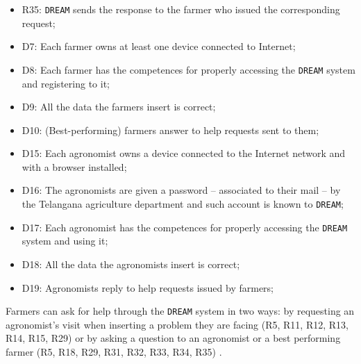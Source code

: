 \documentclass{article}
\begin{document}
\begin{itemize}
    \item R35: \verb|DREAM| sends the response to the farmer who issued the corresponding request;
    
    \item D7: Each farmer owns at least one device connected to Internet;
    
    \item D8: Each farmer has the competences for properly accessing the \verb|DREAM| system and registering to it;
    
    \item D9: All the data the farmers insert is correct;
    
    \item D10: (Best-performing) farmers answer to help requests sent to them;
    
    \item D15: Each agronomist owns a device connected to the Internet network and with a browser installed;

    \item D16: The agronomists are given a password – associated to their mail – by the Telangana agriculture department and such account is known to \verb|DREAM|;

    \item D17: Each agronomist has the competences for properly accessing the \verb|DREAM| system and using it;
  
    \item D18: All the data the agronomists insert is correct;
  
    \item D19: Agronomists reply to help requests issued by farmers;

\end{itemize}
Farmers can ask for help through the \verb|DREAM| system in two ways: by requesting an agronomist's visit when inserting a problem they are facing (R5, R11, R12, R13, R14, R15, R29) or by asking a question to an agronomist or a best performing farmer (R5, R18, R29, R31, R32, R33, R34, R35) .
\end{document}
